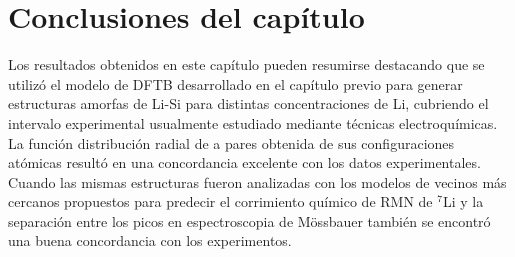 \section{Conclusiones del capítulo}

Los resultados obtenidos en este capítulo pueden resumirse destacando que 
se utilizó el modelo de DFTB desarrollado en el capítulo previo para generar 
estructuras amorfas de Li-Si para distintas concentraciones de Li, cubriendo
el intervalo experimental usualmente estudiado mediante técnicas electroquímicas. La función distribución radial de a pares 
obtenida de sus configuraciones atómicas resultó en una concordancia excelente
con los datos experimentales. Cuando las mismas estructuras fueron analizadas 
con los modelos de vecinos más cercanos propuestos para predecir el corrimiento
químico de RMN de $^7$Li y la separación entre los picos en espectroscopia de 
Mössbauer también se encontró una buena concordancia con los experimentos.
